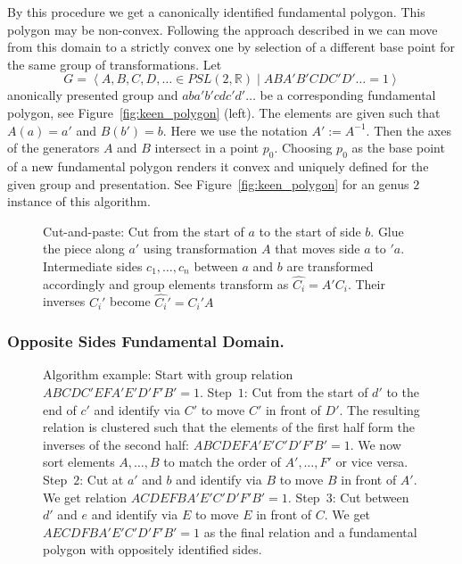 \documentclass[Thesis]{subfiles}
\begin{document}
By this procedure we get a canonically identified fundamental polygon. This polygon may be non-convex. Following the approach described in \cite{keen1966} we can move from this domain to a strictly convex one by selection of a different base point for the same group of transformations. Let
\[G=\left<A,B,C,D,\ldots\in \mathit{PSL}(2,\mathbb R)\mid ABA'B'CDC'D'\ldots=1\right>\]
anonically presented group and $aba'b'cdc'd'\ldots$ be a corresponding fundamental polygon, see Figure~\ref{fig:keen_polygon} (left). The elements are given such that $A(a)=a'$ and $B(b')=b$. Here we use the notation $A':=A^{-1}$. Then the axes of the generators $A$ and $B$ intersect in a point $p_0$. Choosing $p_0$ as the base point of a new fundamental polygon renders it convex and uniquely defined for the given group and presentation. See Figure~\ref{fig:keen_polygon} for an genus $2$ instance of this algorithm.

\begin{figure}
\centering
\resizebox{0.5\textwidth}{!} {

}
\caption{Cut-and-paste: Cut from the start of $a$ to the start of side $b$. Glue the piece along $a'$ using transformation $A$ that moves side $a$ to $'a$. Intermediate sides $c_1,\ldots,c_n$ between $a$ and $b$ are transformed accordingly and group elements transform as $\hat{C_i}=A'C_i$. Their inverses $C_i'$ become $\hat{C_i}'=C_i'A$}
\label{fig:cut-and-paste-canonical}
\end{figure}

\subsubsection*{Opposite Sides Fundamental Domain.}

\begin{figure}
\caption{Algorithm example: Start with group relation $ABCDC' EFA'E'D'F'B' = 1$. Step~$1$: Cut from the start of $d'$ to the end of $c'$ and identify via $C'$ to move $C'$ in front of $D'$. The resulting relation is clustered such that the elements of the first half form the inverses of the second half: $ABCDEFA'E'C'D'F'B' = 1$. We now sort elements $A,\ldots,B$ to match the order of $A',\ldots,F'$ or vice versa. Step~$2$: Cut at $a'$ and $b$ and identify via $B$ to move $B$ in front of $A'$. We get relation $ACDEFBA'E'C'D'F'B' = 1$. Step~$3$: Cut between $d'$ and $e$ and identify via $E$ to move $E$ in front of $C$. We get $AECDFBA'E'C'D'F'B' = 1$ as the final relation and a fundamental polygon with oppositely identified sides.}
\label{fig:opposite_algorithm}
\end{figure}
\end{document}
